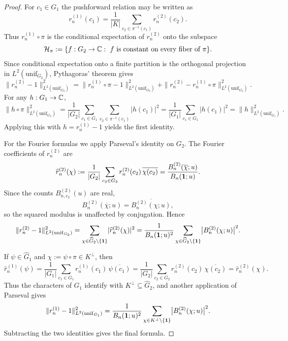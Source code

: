 \begin{proof}
For \(c_1\in G_1\) the pushforward relation may be written as
\[
r_n^{(1)}(c_1)=\frac{1}{|K|}\sum_{c_2\in\pi^{-1}(c_1)}r_n^{(2)}(c_2).
\]
Thus \(r_n^{(1)}\circ \pi\) is the conditional expectation of \(r_n^{(2)}\) onto the subspace
\[
\mathcal H_\pi:=\{f:G_2\to\mathbb{C}:\ f \text{ is constant on every fiber of }\pi\}.
\]
Since conditional expectation onto a finite partition is the orthogonal projection in \(L^2(\mathrm{unif}_{G_2})\), Pythagoras' theorem gives
\[
\|r_n^{(2)}-1\|_{L^2(\mathrm{unif}_{G_2})}^2
=
\|r_n^{(1)}\circ\pi-1\|_{L^2(\mathrm{unif}_{G_2})}^2
+
\|r_n^{(2)}-r_n^{(1)}\circ\pi\|_{L^2(\mathrm{unif}_{G_2})}^2.
\]
For any \(h:G_1\to\mathbb{C}\),
\[
\|h\circ\pi\|_{L^2(\mathrm{unif}_{G_2})}^2
=
\frac{1}{|G_2|}\sum_{c_1\in G_1}\sum_{c_2\in\pi^{-1}(c_1)}|h(c_1)|^2
=
\frac{1}{|G_1|}\sum_{c_1\in G_1}|h(c_1)|^2
=
\|h\|_{L^2(\mathrm{unif}_{G_1})}^2.
\]
Applying this with \(h=r_n^{(1)}-1\) yields the first identity.

For the Fourier formulas we apply Parseval's identity on \(G_2\). The Fourier coefficients of \(r_n^{(2)}\) are
\[
\widehat r_n^{(2)}(\chi)
:=
\frac{1}{|G_2|}\sum_{c_2\in G_2}r_n^{(2)}(c_2)\,\overline{\chi(c_2)}
=
\frac{B_n^{(2)}(\overline\chi;u)}{B_n(\mathbf{1};u)}.
\]
Since the counts \(B^{(2)}_{n,c_2}(u)\) are real,
\[
B_n^{(2)}(\overline\chi;u)=\overline{B_n^{(2)}(\chi;u)},
\]
so the squared modulus is unaffected by conjugation. Hence
\[
\|r_n^{(2)}-1\|_{L^2(\mathrm{unif}_{G_2})}^2
=
\sum_{\chi\in\widehat G_2\setminus\{\mathbf{1}\}}\lvert \widehat r_n^{(2)}(\chi)\rvert^2
=
\frac{1}{B_n(\mathbf{1};u)^2}
\sum_{\chi\in\widehat G_2\setminus\{\mathbf{1}\}}
\bigl|B_n^{(2)}(\chi;u)\bigr|^2.
\]

If \(\psi\in\widehat G_1\) and \(\chi:=\psi\circ\pi\in K^\perp\), then
\[
\widehat r_n^{(1)}(\psi)
=
\frac{1}{|G_1|}\sum_{c_1\in G_1}r_n^{(1)}(c_1)\,\overline{\psi(c_1)}
=
\frac{1}{|G_2|}\sum_{c_2\in G_2}r_n^{(2)}(c_2)\,\overline{\chi(c_2)}
=
\widehat r_n^{(2)}(\chi).
\]
Thus the characters of \(G_1\) identify with \(K^\perp\subseteq\widehat G_2\), and another application of Parseval gives
\[
\|r_n^{(1)}-1\|_{L^2(\mathrm{unif}_{G_1})}^2
=
\frac{1}{B_n(\mathbf{1};u)^2}
\sum_{\chi\in K^\perp\setminus\{\mathbf{1}\}}
\bigl|B_n^{(2)}(\chi;u)\bigr|^2.
\]
Subtracting the two identities gives the final formula.
\end{proof}

\endinput
